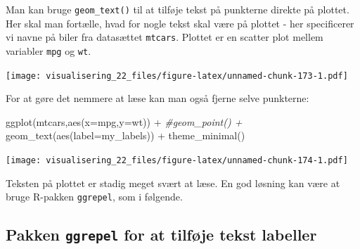 \documentclass[
]{book}
\newenvironment{Shaded}{\begin{snugshade}}{\end{snugshade}}
\newcommand{\AttributeTok}[1]{\textcolor[rgb]{0.77,0.63,0.00}{#1}}
\newcommand{\CommentTok}[1]{\textcolor[rgb]{0.56,0.35,0.01}{\textit{#1}}}
\newcommand{\FunctionTok}[1]{\textcolor[rgb]{0.00,0.00,0.00}{#1}}
\newcommand{\NormalTok}[1]{#1}
\newcommand{\OtherTok}[1]{\textcolor[rgb]{0.56,0.35,0.01}{#1}}
\newcommand{\SpecialCharTok}[1]{\textcolor[rgb]{0.00,0.00,0.00}{#1}}
\begin{document}
Man kan bruge \texttt{geom\_text()} til at tilføje tekst på punkterne direkte på plottet. Her skal man fortælle, hvad for nogle tekst skal være på plottet - her specificerer vi navne på biler fra datasættet \texttt{mtcars}. Plottet er en scatter plot mellem variabler \texttt{mpg} og \texttt{wt}.

\begin{Shaded}
\end{Shaded}

\texttt{[image: visualisering\_22\_files/figure-latex/unnamed-chunk-173-1.pdf]}

For at gøre det nemmere at læse kan man også fjerne selve punkterne:

\begin{Shaded}
\begin{Highlighting}[]
\FunctionTok{ggplot}\NormalTok{(mtcars,}\FunctionTok{aes}\NormalTok{(}\AttributeTok{x=}\NormalTok{mpg,}\AttributeTok{y=}\NormalTok{wt)) }\SpecialCharTok{+} 
  \CommentTok{\#geom\_point() +}
  \FunctionTok{geom\_text}\NormalTok{(}\FunctionTok{aes}\NormalTok{(}\AttributeTok{label=}\NormalTok{my\_labels)) }\SpecialCharTok{+} 
  \FunctionTok{theme\_minimal}\NormalTok{()}
\end{Highlighting}
\end{Shaded}

\texttt{[image: visualisering\_22\_files/figure-latex/unnamed-chunk-174-1.pdf]}

Teksten på plottet er stadig meget svært at læse. En god løsning kan være at bruge R-pakken \texttt{ggrepel}, som i følgende.

\hypertarget{pakken-ggrepel-for-at-tilfuxf8je-tekst-labeller}{%
\subsection{\texorpdfstring{Pakken \texttt{ggrepel} for at tilføje tekst labeller}{Pakken ggrepel for at tilføje tekst labeller}}\label{pakken-ggrepel-for-at-tilfuxf8je-tekst-labeller}}
\end{document}
